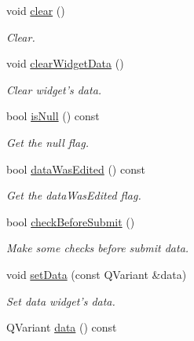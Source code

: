 \begin{DoxyCompactItemize}
void \hyperlink{classmdt_sql_field_handler_a10467d49304f7bc0c75e280098e3e0bc}{clear} ()
\begin{DoxyCompactList}\small\item\em Clear. \end{DoxyCompactList}\item 
void \hyperlink{classmdt_sql_field_handler_ad482be9d476c3310373078a6cd949714}{clearWidgetData} ()
\begin{DoxyCompactList}\small\item\em Clear widget's data. \end{DoxyCompactList}\item 
\hypertarget{classmdt_sql_field_handler_a32c52fa21b4a0e2165e1fbbb8f7fe3b7}{
bool \hyperlink{classmdt_sql_field_handler_a32c52fa21b4a0e2165e1fbbb8f7fe3b7}{isNull} () const }
\label{classmdt_sql_field_handler_a32c52fa21b4a0e2165e1fbbb8f7fe3b7}

\begin{DoxyCompactList}\small\item\em Get the null flag. \end{DoxyCompactList}\item 
\hypertarget{classmdt_sql_field_handler_a08ed5d8dde1447a5bc42af003551641f}{
bool \hyperlink{classmdt_sql_field_handler_a08ed5d8dde1447a5bc42af003551641f}{dataWasEdited} () const }
\label{classmdt_sql_field_handler_a08ed5d8dde1447a5bc42af003551641f}

\begin{DoxyCompactList}\small\item\em Get the dataWasEdited flag. \end{DoxyCompactList}\item 
\hypertarget{classmdt_sql_field_handler_abb37a65b248a02a126676b45ee90789a}{
bool \hyperlink{classmdt_sql_field_handler_abb37a65b248a02a126676b45ee90789a}{checkBeforeSubmit} ()}
\label{classmdt_sql_field_handler_abb37a65b248a02a126676b45ee90789a}

\begin{DoxyCompactList}\small\item\em Make some checks before submit data. \end{DoxyCompactList}\item 
\hypertarget{classmdt_sql_field_handler_a14478a0cd018cf2803dd41061c901aad}{
void \hyperlink{classmdt_sql_field_handler_a14478a0cd018cf2803dd41061c901aad}{setData} (const QVariant \&data)}
\label{classmdt_sql_field_handler_a14478a0cd018cf2803dd41061c901aad}

\begin{DoxyCompactList}\small\item\em Set data widget's data. \end{DoxyCompactList}\item 
\hypertarget{classmdt_sql_field_handler_a1ca9ec373a844a3dcf5f46807259171f}{
QVariant \hyperlink{classmdt_sql_field_handler_a1ca9ec373a844a3dcf5f46807259171f}{data} () const }
\label{classmdt_sql_field_handler_a1ca9ec373a844a3dcf5f46807259171f}


\end{DoxyCompactItemize}

